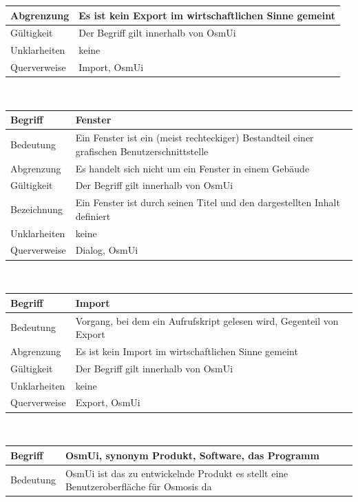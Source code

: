 \documentclass[a4paper,12pt]{scrartcl}
\begin{document}
\begin{center}
\begin{tabular}{|p{5cm}|p{10cm}|}
\hline Abgrenzung & Es ist kein Export im wirtschaftlichen  Sinne gemeint\\ 
\hline Gültigkeit & Der Begriff gilt innerhalb von OsmUi \\ 
\hline Unklarheiten & keine \\ 
\hline Querverweise & Import, OsmUi \\ 
\hline
\end{tabular}
\vspace{0.7cm}
\\
\begin{tabular}{|p{5cm}|p{10cm}|}
\hline Begriff & \textbf{Fenster}\\ 
\hline Bedeutung & Ein Fenster ist ein (meist rechteckiger) Bestandteil einer grafischen Benutzerschnittstelle \\ 
\hline Abgrenzung & Es handelt sich nicht um ein Fenster in einem Gebäude\\ 
\hline Gültigkeit & Der Begriff gilt innerhalb von OsmUi\\ 
\hline Bezeichnung & Ein Fenster ist durch seinen Titel und den dargestellten Inhalt definiert \\ 
\hline Unklarheiten & keine \\ 
\hline Querverweise & Dialog, OsmUi \\ 
\hline
\end{tabular}
\vspace{0.7cm}
\\
\begin{tabular}{|p{5cm}|p{10cm}|}
\hline Begriff & \textbf{Import}\\
\hline Bedeutung & Vorgang, bei dem ein Aufrufskript gelesen wird, Gegenteil von Export \\ 
\hline Abgrenzung & Es ist kein Import im wirtschaftlichen Sinne gemeint\\ 
\hline Gültigkeit & Der Begriff gilt innerhalb von OsmUi \\ 
\hline Unklarheiten & keine \\ 
\hline Querverweise & Export, OsmUi \\ 
\hline
\end{tabular}
\vspace{0.7cm}
\\
\begin{tabular}{|p{5cm}|p{10cm}|}
\hline Begriff & \textbf{OsmUi}, synonym Produkt, Software, das Programm \\ 
\hline Bedeutung & OsmUi ist das zu entwickelnde Produkt es stellt eine Benutzeroberfläche für Osmosis da \\ 

\end{tabular}
\end{center}
\end{document}
